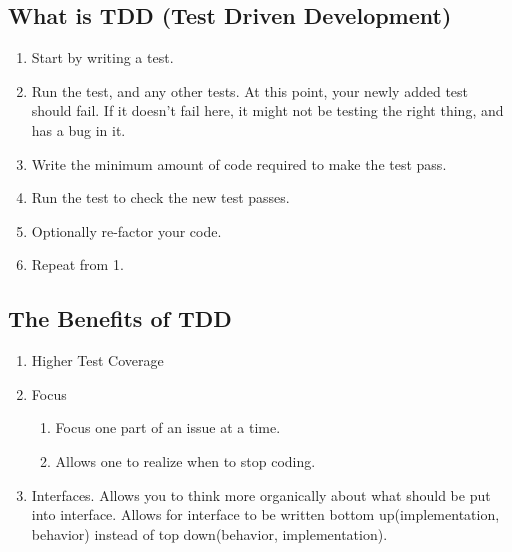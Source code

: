 \subsection{What is TDD (Test Driven Development)}
\begin{enumerate}
  \item Start by writing a test.
  \item Run the test, and any other tests. At this point, your newly added test
  should fail. If it doesn't fail here, it might not be testing the right thing,
  and has a bug in it.
  \item Write the minimum amount of code required to make the test pass.
  \item Run the test to check the new test passes.
  \item Optionally re-factor your code.
  \item Repeat from 1.
\end{enumerate}

\subsection{ The Benefits of TDD }
\begin{enumerate}
  \item Higher Test Coverage
  \item Focus
    \begin{enumerate}
      \item Focus one part of an issue at a time.
      \item Allows one to realize when to stop coding.
    \end{enumerate}
  \item Interfaces. Allows you to think more organically about what should be
  put into interface. Allows for interface to be written bottom
  up(implementation, behavior) instead of top down(behavior, implementation).
\end{enumerate}
